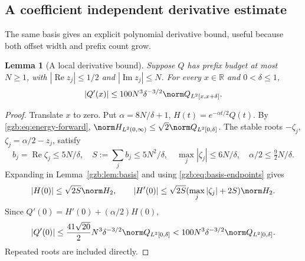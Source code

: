 \documentclass[11pt,a4paper]{article}
\numberwithin{equation}{section}
\newtheorem{lemma}[theorem]{Lemma}
\theoremstyle{definition}\newtheorem{definition}[theorem]{Definition}
\theoremstyle{remark}\newtheorem{remark}[theorem]{Remark}
\newcommand{\R}{\mathbb R}\newcommand{\C}{\mathbb C}\newcommand{\N}{\mathbb N}
\DeclareMathOperator{\Rea}{Re}\DeclareMathOperator{\Ima}{Im}
\begin{document}
\subsection{A coefficient independent derivative estimate}
The same basis gives an explicit polynomial derivative bound, useful
because both offset width and prefix count grow.
\begin{lemma}[A local derivative bound]\label{gzb:lem:local-derivative}
Suppose $Q$ has prefix budget at most $N\ge1$, with
$|\Rea z_j|\le1/2$ and $|\Ima z_j|\le N$.
For every $x\in\R$ and $0<\delta\le1$,
\begin{equation}\label{gzb:eq:local-derivative}
 |Q'(x)|\le100N^3\delta^{-3/2}
                           \norm Q_{L^2[x,x+\delta]}.
\end{equation}
\end{lemma}
\begin{proof}
Translate $x$ to zero. Put $\alpha=8N/\delta+1$,
$H(t)=e^{-\alpha t/2}Q(t)$.
By \eqref{gzb:eq:energy-forward},
$\norm H_{L^2(0,\infty)}\le\sqrt2\norm Q_{L^2[0,\delta]}$.
The stable roots $-\zeta_j$, $\zeta_j=\alpha/2-z_j$, satisfy
\[
 b_j=\Rea\zeta_j\le5N/\delta,\quad
 S:=\sum_jb_j\le5N^2/\delta,\quad
 \max_j|\zeta_j|\le6N/\delta,\quad \alpha/2\le\tfrac92N/\delta.
\]
Expanding in Lemma~\ref{gzb:lem:basis} and using \eqref{gzb:eq:basis-endpoints} gives
\[
 |H(0)|\le\sqrt{2S}\norm H_2,\qquad
 |H'(0)|\le\sqrt{2S}(\max_j|\zeta_j|+2S)\norm H_2.
\]
Since $Q'(0)=H'(0)+(\alpha/2)H(0)$,
\[
 |Q'(0)|\le\frac{41\sqrt{20}}2N^3\delta^{-3/2}
                   \norm Q_{L^2[0,\delta]}
          <100N^3\delta^{-3/2}\norm Q_{L^2[0,\delta]}.
\]
Repeated roots are included directly.
\end{proof}
\end{document}
